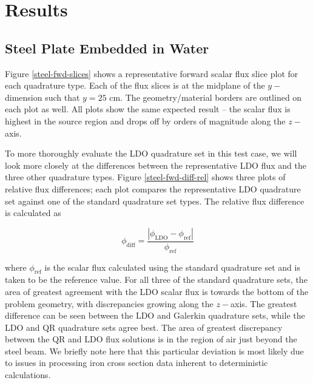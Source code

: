 \documentclass{article} %
\begin{document}
\section{Results}
\label{sec:results}

\subsection{Steel Plate Embedded in Water}

Figure \ref{steel-fwd-slices} shows a representative forward scalar flux slice
plot for each quadrature type. Each of the flux slices is at the midplane of
the $y-$dimension such that $y = 25$ cm. The geometry/material borders are
outlined on each plot as well. All plots show the same expected result -- the
scalar flux is highest in the source region and drops off by orders of
magnitude along the $z-$axis.

To more thoroughly evaluate the LDO quadrature set in this test case, we will
look more closely at the differences between the representative LDO flux and
the three other quadrature types. Figure \ref{steel-fwd-diff-rel} shows three
plots of relative
flux differences; each plot compares the representative LDO quadrature set against one
of the standard quadrature set types. The relative flux difference is calculated as

\begin{equation}
\phi_{\mathrm{diff}} = 
\frac{\left|\phi_{\mathrm{LDO}}-\phi_{\mathrm{ref}}\right|}{\phi_{\mathrm{ref}}}
\label{flux-diff}
\end{equation}

\noindent where $\phi_{\mathrm{ref}}$ is the scalar flux calculated using the 
standard quadrature set and is taken to be the reference value. For all three of the
standard quadrature sets, the area of greatest agreement with the LDO scalar flux is
towards the bottom of the problem geometry, with discrepancies growing along the
$z-$axis. The greatest difference can be seen between the LDO and Galerkin quadrature 
sets, while the LDO and QR quadrature sets agree best. The area of greatest
discrepancy between the QR and LDO flux solutions is in the region of air just beyond
the steel beam. We briefly note here that this particular deviation is most 
likely due to issues in processing iron cross section data inherent to deterministic
calculations.
\end{document}
